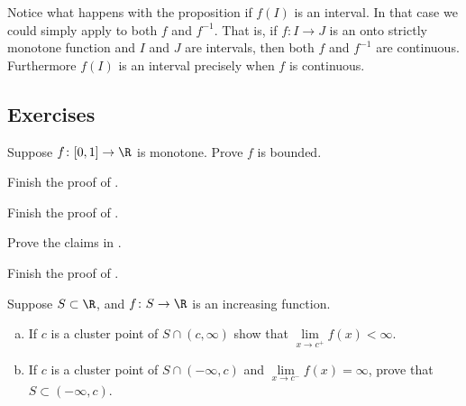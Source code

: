 \documentclass[12pt]{book}
\begin{document}
Notice what happens with the proposition if $f(I)$ is an interval.
In that case we could simply
apply  to both $f$ and $f^{-1}$.
That is, if
$f \colon I \to J$ is an onto strictly monotone function and $I$ and $J$ are intervals,
then both $f$ and $f^{-1}$ are continuous.
Furthermore $f(I)$ is an
interval precisely when $f$ is continuous.

%
%

\subsection*{Exercises}

\begin{exercise}
Suppose $f \colon [0,1] \to \R$ is monotone.
Prove $f$ is bounded.
\end{exercise}

\begin{exercise}
Finish the proof of .
\end{exercise}

\begin{exercise}
Finish the proof of .
\end{exercise}

\begin{exercise}
Prove the claims in .
\end{exercise}

\begin{exercise}
Finish the proof of .
\end{exercise}

\begin{exercise}
Suppose $S \subset \R$, and $f \colon S \to \R$ is an increasing
function.
\begin{enumerate}[a)]
 \item If $c$ is a cluster point
of $S \cap (c,\infty)$ show that 
$\lim\limits_{x\to c^+} f(x) < \infty$.
 \item If $c$ is a cluster point of $S \cap (-\infty,c)$
and $\lim\limits_{x\to c^-} f(x) = \infty$, prove that 
$S \subset (-\infty,c)$.
\end{enumerate}
\end{exercise}
\end{document}
